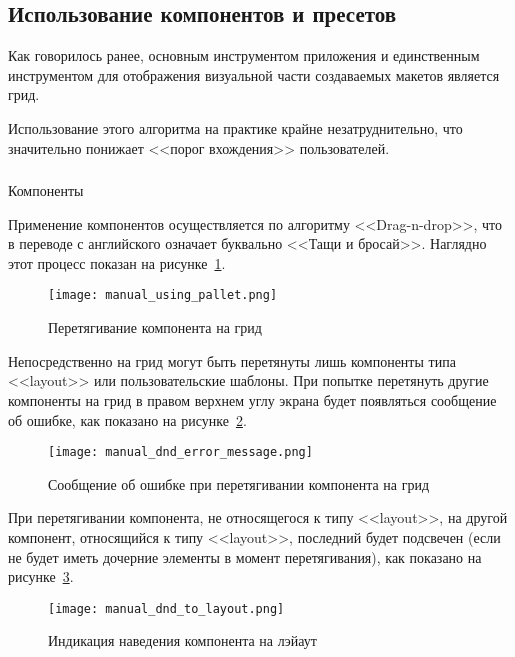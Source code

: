 \subsection{Использование компонентов и пресетов}
\label{sec:manual:components_manual}

Как говорилось ранее, основным инструментом приложения и единственным инструментом для отображения визуальной части создаваемых макетов является грид.

Использование этого алгоритма на практике крайне незатруднительно, что значительно понижает <<порог вхождения>> пользователей.

\subsubsection{}Компоненты
\

Применение компонентов осуществляется по алгоритму <<Drag-n-drop>>, что в переводе с английского означает буквально <<Тащи и бросай>>. Наглядно этот процесс показан на рисунке~\ref{sec:manual:manual_using_pallet}.

\begin{figure}[ht]
	\centering
    \texttt{[image: manual\_using\_pallet.png]}
    \caption{Перетягивание компонента на грид}
    \label{sec:manual:manual_using_pallet}
\end{figure}

Непосредственно на грид могут быть перетянуты лишь компоненты типа <<layout>> или пользовательские шаблоны. При попытке перетянуть другие компоненты на грид в правом верхнем углу экрана будет появляться сообщение об ошибке, как показано на рисунке~\ref{sec:manual:manual_dnd_error_message}.

\begin{figure}[ht]
	\centering
    \texttt{[image: manual\_dnd\_error\_message.png]}
    \caption{Сообщение об ошибке при перетягивании компонента на грид}
    \label{sec:manual:manual_dnd_error_message}
\end{figure}

При перетягивании компонента, не относящегося к типу <<layout>>, на другой компонент, относящийся к типу <<layout>>, последний будет подсвечен (если не будет иметь дочерние элементы в момент перетягивания), как показано на рисунке~\ref{sec:manual:manual_dnd_to_layout}.

\begin{figure}[ht]
	\centering
    \texttt{[image: manual\_dnd\_to\_layout.png]}
    \caption{Индикация наведения компонента на лэйаут}
    \label{sec:manual:manual_dnd_to_layout}
\end{figure}

